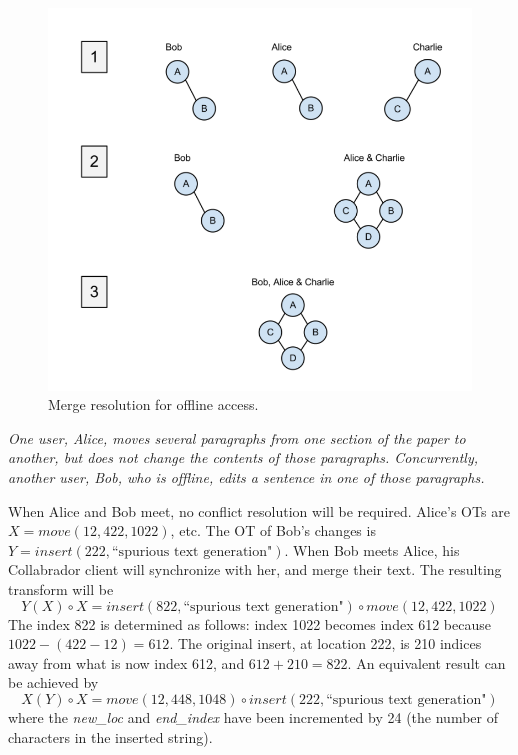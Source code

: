 \documentclass[11pt,titlepage]{article}
\begin{document}
\begin{figure}[h]
  \centering
  \includegraphics[width=5in]{image.png}
  \caption{Merge resolution for offline access.  \label{fig:image}}
\end{figure}

\vspace{5mm}
\noindent
\emph{One user, Alice, moves several paragraphs from one section of
  the paper to another, but does not change the contents of those
  paragraphs. Concurrently, another user, Bob, who is offline, edits a
  sentence in one of those paragraphs.}

\vspace{5mm}

When Alice and Bob meet, no conflict resolution will be
required. Alice's OTs are $X = move(12,422, 1022)$, etc.  The OT of
Bob's changes is $Y = insert(222, \text{``spurious text
  generation"})$. When Bob meets Alice, his Collabrador client will
synchronize with her, and merge their text. The resulting transform
will be
\begin{equation*}
  Y(X) \circ X = insert(822,
  \text{``spurious text generation"}) \circ move(12,422, 1022)
\end{equation*}
The index 822 is determined as follows: index 1022 becomes index 612
because \(1022-(422-12) = 612.\) The original insert, at location 222,
is 210 indices away from what is now index 612, and \(612+210 = 822.\)
An equivalent result can be achieved by
\begin{equation*}
  X(Y) \circ X = move(12,448,1048) \circ insert(222, \text{``spurious text generation"})
\end{equation*}
where the \textit{new\_loc} and \textit{end\_index} have been
incremented by 24 (the number of characters in the inserted string).
\end{document}
